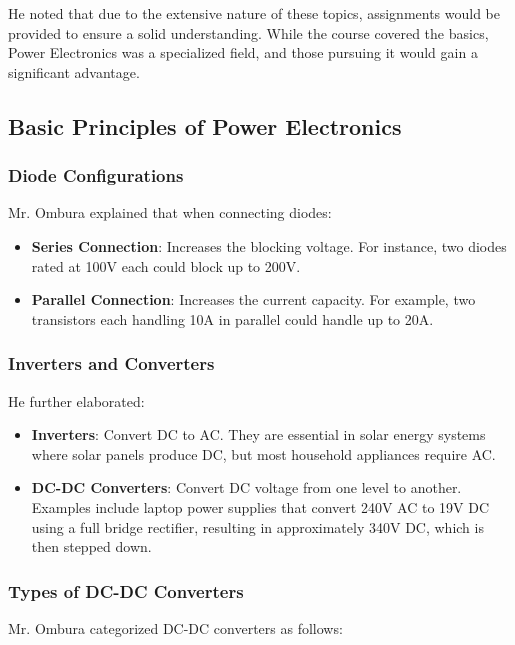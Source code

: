 He noted that due to the extensive nature of these topics, assignments would be provided to ensure a solid understanding. While the course covered the basics, Power Electronics was a specialized field, and those pursuing it would gain a significant advantage.

\subsection{Basic Principles of Power Electronics}

\subsubsection{Diode Configurations}

Mr. Ombura explained that when connecting diodes:

\begin{itemize}
    \item \textbf{Series Connection}: Increases the blocking voltage. For instance, two diodes rated at 100V each could block up to 200V.
    \item \textbf{Parallel Connection}: Increases the current capacity. For example, two transistors each handling 10A in parallel could handle up to 20A.
\end{itemize}

\subsubsection{Inverters and Converters}

He further elaborated:

\begin{itemize}
    \item \textbf{Inverters}: Convert DC to AC. They are essential in solar energy systems where solar panels produce DC, but most household appliances require AC.
    \item \textbf{DC-DC Converters}: Convert DC voltage from one level to another. Examples include laptop power supplies that convert 240V AC to 19V DC using a full bridge rectifier, resulting in approximately 340V DC, which is then stepped down.
\end{itemize}

\subsubsection{Types of DC-DC Converters}

Mr. Ombura categorized DC-DC converters as follows:

